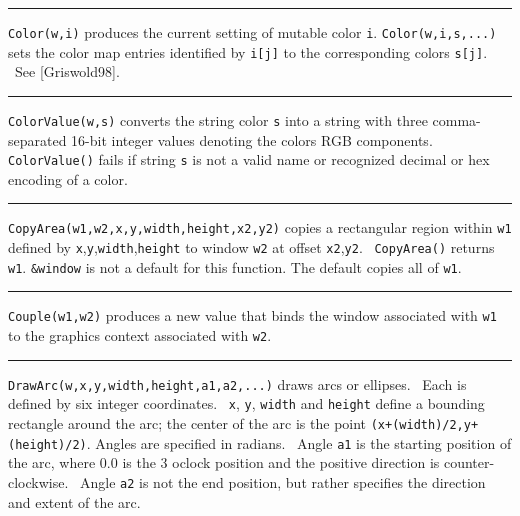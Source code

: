 \bigskip\hrule\vspace{0.1cm}

\noindent
\texttt{Color(w,i)} produces the current setting of mutable color
\texttt{i}. \texttt{Color(w,i,s,...)} sets the color map entries
identified by \texttt{i[j]} to the corresponding colors \texttt{s[j]}.
\ See [Griswold98].

\bigskip\hrule\vspace{0.1cm}

\noindent
\texttt{ColorValue(w,s)} converts the string color \texttt{s} into a
string with three comma-separated 16-bit integer values denoting the
color{\textquotesingle}s RGB components. \texttt{ColorValue()} fails if
string \texttt{s} is not a valid name or recognized decimal or hex
encoding of a color.

\bigskip\hrule\vspace{0.1cm}

\noindent
\texttt{CopyArea(w1,w2,x,y,width,height,x2,y2)} copies a rectangular
region within \texttt{w1} defined by
\texttt{x},\texttt{y},\texttt{width},\texttt{height} to window
\texttt{w2} at offset \texttt{x2},\texttt{y2}. \ \texttt{CopyArea()}
returns \texttt{w1}. \texttt{\&window} is not a default for this
function. The default copies all of \texttt{w1}.

\bigskip\hrule\vspace{0.1cm}

\noindent
\texttt{Couple(w1,w2)} produces a new value that binds the window
associated with \texttt{w1} to the graphics context associated with
\texttt{w2}.

\bigskip\hrule\vspace{0.1cm}

\noindent
\texttt{DrawArc(w,x,y,width,height,a1,a2,...)} draws arcs or ellipses.
\ Each is defined by six integer coordinates. \ \texttt{x}, \texttt{y},
\texttt{width} and \texttt{height} define a bounding rectangle around
the arc; the center of the arc is the point
\texttt{(x+(width)/2,y+(height)/2)}. Angles are specified in radians.
\ Angle \texttt{a1} is the starting position of the arc, where 0.0 is
the 3 o{\textquotesingle}clock position and the positive direction is
counter-clockwise. \ Angle \texttt{a2} is not the end position, but
rather specifies the direction and extent of the arc.

